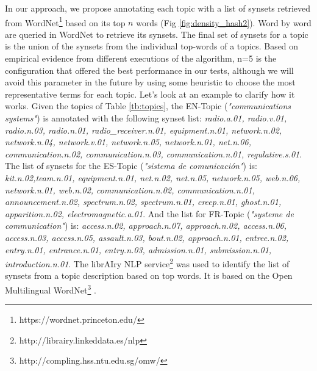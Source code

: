 In our approach, we propose annotating each topic with a list of synsets \citep{Bond2013} retrieved from WordNet\footnote{https://wordnet.princeton.edu/} based on its top $n$ words (Fig \ref{fig:density_hash2}). Word by word are queried in WordNet to retrieve its synsets. The final set of synsets for a topic is the union of the synsets from the individual top-words of a topics. Based on empirical evidence from different executions of the algorithm, n=5 is the configuration that offered the best performance in our tests, although we will avoid this parameter in the future by using some heuristic to choose the most representative terms for each topic. Let's look at an example to clarify how it works. Given the topics of Table \ref{tb:topics}, the EN-Topic (\textit{"communications systems"}) is annotated with the following synset list: \textit{radio.a.01, radio.v.01, radio.n.03, radio.n.01, radio\_receiver.n.01, equipment.n.01, network.n.02, network.n.04, network.v.01, network.n.05, network.n.01, net.n.06, communication.n.02, communication.n.03, communication.n.01, regulative.s.01}. The list of synsets for the ES-Topic (\textit{"sistema de comunicaci\'on"}) is:  \textit{kit.n.02,team.n.01, equipment.n.01, net.n.02, net.n.05, network.n.05, web.n.06, network.n.01, web.n.02, communication.n.02, communication.n.01, announcement.n.02, spectrum.n.02, spectrum.n.01, creep.n.01, ghost.n.01, apparition.n.02, electromagnetic.a.01}. And the list for FR-Topic (\textit{"systeme de communication"}) is:  \textit{access.n.02, approach.n.07, approach.n.02, access.n.06, access.n.03, access.n.05, assault.n.03, bout.n.02, approach.n.01, entree.n.02, entry.n.01, entrance.n.01, entry.n.03, admission.n.01, submission.n.01, introduction.n.01}. The librAIry NLP service\footnote{http://librairy.linkeddata.es/nlp} was used to identify the list of synsets from a topic description based on top words. It is based on the Open Multilingual WordNet\footnote{http://compling.hss.ntu.edu.sg/omw/} \citep{Bond2012}.

